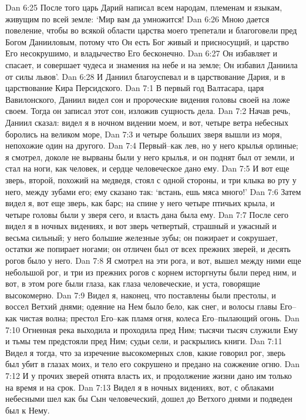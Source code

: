 Dan 6:25  После того царь Дарий написал всем народам, племенам и языкам, живущим по всей земле: `Мир вам да умножится!
Dan 6:26  Мною дается повеление, чтобы во всякой области царства моего трепетали и благоговели пред Богом Данииловым, потому что Он есть Бог живый и присносущий, и царство Его несокрушимо, и владычество Его бесконечно.
Dan 6:27  Он избавляет и спасает, и совершает чудеса и знамения на небе и на земле; Он избавил Даниила от силы львов'.
Dan 6:28  И Даниил благоуспевал и в царствование Дария, и в царствование Кира Персидского.
Dan 7:1  В первый год Валтасара, царя Вавилонского, Даниил видел сон и пророческие видения головы своей на ложе своем. Тогда он записал этот сон, изложив сущность дела.
Dan 7:2  Начав речь, Даниил сказал: видел я в ночном видении моем, и вот, четыре ветра небесных боролись на великом море,
Dan 7:3  и четыре больших зверя вышли из моря, непохожие один на другого.
Dan 7:4  Первый--как лев, но у него крылья орлиные; я смотрел, доколе не вырваны были у него крылья, и он поднят был от земли, и стал на ноги, как человек, и сердце человеческое дано ему.
Dan 7:5  И вот еще зверь, второй, похожий на медведя, стоял с одной стороны, и три клыка во рту у него, между зубами его; ему сказано так: `встань, ешь мяса много!'
Dan 7:6  Затем видел я, вот еще зверь, как барс; на спине у него четыре птичьих крыла, и четыре головы были у зверя сего, и власть дана была ему.
Dan 7:7  После сего видел я в ночных видениях, и вот зверь четвертый, страшный и ужасный и весьма сильный; у него большие железные зубы; он пожирает и сокрушает, остатки же попирает ногами; он отличен был от всех прежних зверей, и десять рогов было у него.
Dan 7:8  Я смотрел на эти рога, и вот, вышел между ними еще небольшой рог, и три из прежних рогов с корнем исторгнуты были перед ним, и вот, в этом роге были глаза, как глаза человеческие, и уста, говорящие высокомерно.
Dan 7:9  Видел я, наконец, что поставлены были престолы, и воссел Ветхий днями; одеяние на Нем было бело, как снег, и волосы главы Его--как чистая волна; престол Его--как пламя огня, колеса Его--пылающий огонь.
Dan 7:10  Огненная река выходила и проходила пред Ним; тысячи тысяч служили Ему и тьмы тем предстояли пред Ним; судьи сели, и раскрылись книги.
Dan 7:11  Видел я тогда, что за изречение высокомерных слов, какие говорил рог, зверь был убит в глазах моих, и тело его сокрушено и предано на сожжение огню.
Dan 7:12  И у прочих зверей отнята власть их, и продолжение жизни дано им только на время и на срок.
Dan 7:13  Видел я в ночных видениях, вот, с облаками небесными шел как бы Сын человеческий, дошел до Ветхого днями и подведен был к Нему.
